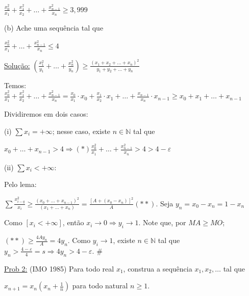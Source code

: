 \documentclass[a4paper,12pt]{article}
\renewcommand{\epsilon}{\ensuremath{\varepsilon}}
\renewcommand{\leq}{\ensuremath{\leqslant}}
\renewcommand{\geq}{\ensuremath{\geqslant}}
\theoremstyle{plain} %
\theoremstyle{definition} %
\theoremstyle{remark} %
\begin{document}
	\begin{center}
		$\displaystyle\frac{x_0^2}{x_1}+\frac{x_1^2}{x_2}+\dots+\frac{x_{n-1}^2}{x_n}\geq 3,999$
	\end{center}
	
	(b) Ache uma sequ\^encia tal que
	
	\begin{center}
		$\displaystyle\frac{x_0^2}{x_1}+\dots+\frac{x_{n-1}^2}{x_n}\leq 4$
	\end{center}
	
	\begin{framed}
		\underline{Solu\c{c}\~ao:}  $\left(\displaystyle\frac{x_1^2}{y_1}+\dots +\frac{x_n^2}{y_n}\right)\geq \displaystyle\frac{(x_1+x_2+\dotso+x_n)^2}{y_1+y_2+\dotso+y_n}$
		
		Temos: $\displaystyle\frac{x_0^2}{x_1}+\frac{x_1^2}{x_2}+\dots+\frac{x_{n-1}^2}{x_n}=\displaystyle\frac{x_0}{x_1}\cdot x_0+\frac{x_1}{x_2}\cdot x_1+\dots+\frac{x_{n-1}}{x_n}\cdot x_{n-1}\geq x_0+x_1+\dotso+x_{n-1}$
		
		Dividiremos em dois casos:
		
		(i) $\sum x_i=+\infty$; nesse caso, existe $n\in \mathds{N}$ tal que
		
		$x_0+\dotso+x_{n-1}>4\Rightarrow{(\ast)} \displaystyle\frac{x_0^2}{x_1}+\dots+\frac{x_{n-1}^2}{x_n}>4>4-\epsilon$
		
		(ii) $\sum x_i<+\infty$:
		
		Pelo lema: 
		
		$\sum\frac{x_{i-q}^2}{x_i}\geq \frac{(x_0+\dotso+x_{n-1})^2}{(x_1+\dotso+x_{n})}=\frac{[A+(x_0-x_n)]^2}{A}(\ast\ast)$. Seja $y_n=x_0-x_n=1-x_n$
		
		Como $[x_i<+\infty]$, ent\~ao $x_i\rightarrow 0\Rightarrow y_i\rightarrow 1$. Note que, por $MA\geq MO$; 
		
		$(\ast\ast)\geq \frac{4Ay_n}{A}=4y_n$. Como $y_i\rightarrow 1$, existe $n\in \mathds{N}$ tal que $y_n>\frac{4-\epsilon}{4}=s\Rightarrow4y_n>4-\epsilon$. \huge\#
	\end{framed}
	
	\normalsize
	
	\vspace{2ex}\underline{Prob 2:} (IMO 1985) Para todo real $x_1$, construa a sequ\^encia $x_1, x_2, \dotso$ tal que
	
	\begin{center}
		$x_{n+1}=x_n\left(x_n+\frac{1}{n}\right)$ para todo natural $n\geq 1$.
	\end{center}
	
\end{document}
